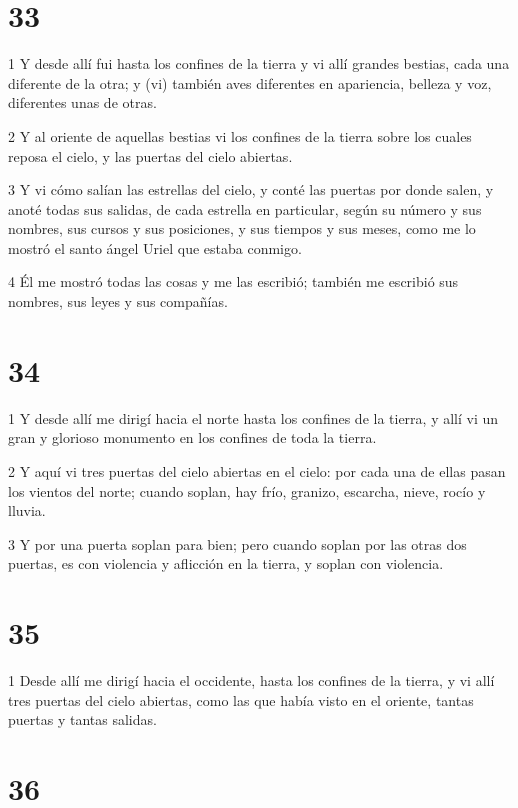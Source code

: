 \chapter{33}

\par 1 Y desde allí fui hasta los confines de la tierra y vi allí grandes bestias, cada una diferente de la otra; y (vi) también aves diferentes en apariencia, belleza y voz, diferentes unas de otras.
\par 2 Y al oriente de aquellas bestias vi los confines de la tierra sobre los cuales reposa el cielo, y las puertas del cielo abiertas.
\par 3 Y vi cómo salían las estrellas del cielo, y conté las puertas por donde salen, y anoté todas sus salidas, de cada estrella en particular, según su número y sus nombres, sus cursos y sus posiciones, y sus tiempos y sus meses, como me lo mostró el santo ángel Uriel que estaba conmigo.
\par 4 Él me mostró todas las cosas y me las escribió; también me escribió sus nombres, sus leyes y sus compañías.

\chapter{34}

\par 1 Y desde allí me dirigí hacia el norte hasta los confines de la tierra, y allí vi un gran y glorioso monumento en los confines de toda la tierra.
\par 2 Y aquí vi tres puertas del cielo abiertas en el cielo: por cada una de ellas pasan los vientos del norte; cuando soplan, hay frío, granizo, escarcha, nieve, rocío y lluvia.
\par 3 Y por una puerta soplan para bien; pero cuando soplan por las otras dos puertas, es con violencia y aflicción en la tierra, y soplan con violencia.

\chapter{35}

\par 1 Desde allí me dirigí hacia el occidente, hasta los confines de la tierra, y vi allí tres puertas del cielo abiertas, como las que había visto en el oriente, tantas puertas y tantas salidas.

\chapter{36}

